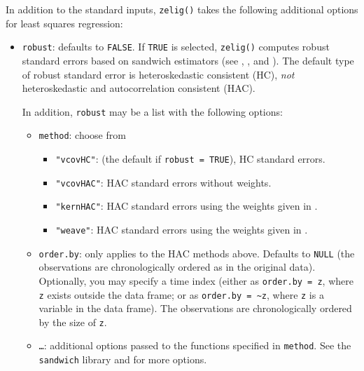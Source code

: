 \documentclass{article}
\begin{document}
In addition to the standard inputs, {\tt zelig()} takes the following
additional options for least squares regression:  
\begin{itemize}
\item {\tt robust}: defaults to {\tt FALSE}.  If {\tt TRUE} is
selected, {\tt zelig()} computes robust standard errors based on
sandwich estimators (see \cite{Zeileis04}, \cite{Huber81}, and
\cite{White80}).  The default type of robust standard error is
heteroskedastic consistent (HC), \emph{not} heteroskedastic and
autocorrelation consistent (HAC).  

In addition, {\tt robust} may be a list with the following options:  
\begin{itemize}
\item {\tt method}:  choose from 
\begin{itemize}
\item {\tt "vcovHC"}: (the default if {\tt robust = TRUE}), HC standard errors.
\item {\tt "vcovHAC"}: HAC standard errors without weights.  
\item {\tt "kernHAC"}: HAC standard errors using the weights given in
\cite{Andrews91}.   
\item {\tt "weave"}: HAC standard errors using the weights given in
\cite{LumHea99}.
\end{itemize} 
\item {\tt order.by}: only applies to the HAC methods above.  Defaults to
{\tt NULL} (the observations are chronologically ordered as in the
original data).  Optionally, you may specify a time index (either as
{\tt order.by = z}, where {\tt z} exists outside the data frame; or
as {\tt order.by = \~{}z}, where {\tt z} is a variable in the data
frame).  The observations are chronologically ordered by the size of
{\tt z}.
\item {\tt \dots}:  additional options passed to the functions
specified in {\tt method}.  See the {\tt sandwich} library and
\cite{Zeileis04} for more options.   
\end{itemize}
\end{itemize}
\end{document}
